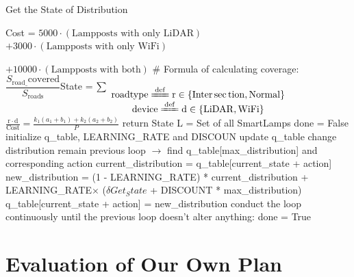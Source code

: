 \documentclass[12pt]{article}
\theoremstyle{definition}
\theoremstyle{remark}
\numberwithin{equation}{section}
\begin{document}
	\begin{algorithm}
		\caption{Get the State of Distribution}
		\label{Type}
		\begin{algorithmic}
		\STATE Cost = $5000\cdot (\text{Lampposts with only LiDAR})$\\ $+3000\cdot  (\text{Lampposts with only WiFi})$\\\par\par$+10000\cdot (\text{Lampposts with both})$
		\STATE \# Formula of calculating coverage: $\dfrac{S_{\mathrm{road\_}} \mathrm{covered}}{S_{\mathrm{roads}}}$​​
		\STATE State = $\sum_{\begin{array}{c}
				\mathrm{road} \mathrm{type}\xlongequal{\mathrm{def}}\mathrm{r}\in \left\{ \mathrm{Inter}\sec\mathrm{tion}, \mathrm{Normal} \right\}\\
				\mathrm{device}\xlongequal{\mathrm{def}}\mathrm{d}\in \left\{ \mathrm{LiDAR}, \mathrm{WiFi} \right\}\\
		\end{array}}$
		\STATE ${\frac{\mathrm{r}\cdot \mathrm{d}}{\mathrm{Cost}}}=\frac{k_1\left( a_1+b_1 \right) +k_2\left( a_2+b_2 \right)}{P}$
		\STATE return State
		\STATE L = Set of all SmartLamps
		\STATE done = False
		\STATE initialize q\_table, LEARNING\_RATE and DISCOUN
		\STATE update q\_table
		\ENDWHILE
		\STATE change distribution
		\ELSE
		\STATE remain
		\ENDIF
		\ENDWHILE
		\ENDFOR
		\STATE previous loop $\rightarrow$ find q\_table[max\_distribution] and corresponding action
		\STATE current\_distribution = q\_table[current\_state + action]
		\STATE new\_distribution = (1 - LEARNING\_RATE) * current\_distribution +\\ LEARNING\_RATE$\times$ ($\delta Get_State$ + DISCOUNT * max\_distribution)
		\STATE q\_table[current\_state + action] = new\_distribution
		\STATE conduct the loop continuously until the previous loop doesn't alter anything:
		\STATE done = True
		\end{algorithmic}
	\end{algorithm}
	
		
		
	
	
	\newpage
	\section{Evaluation of Our Own Plan}
\end{document}
